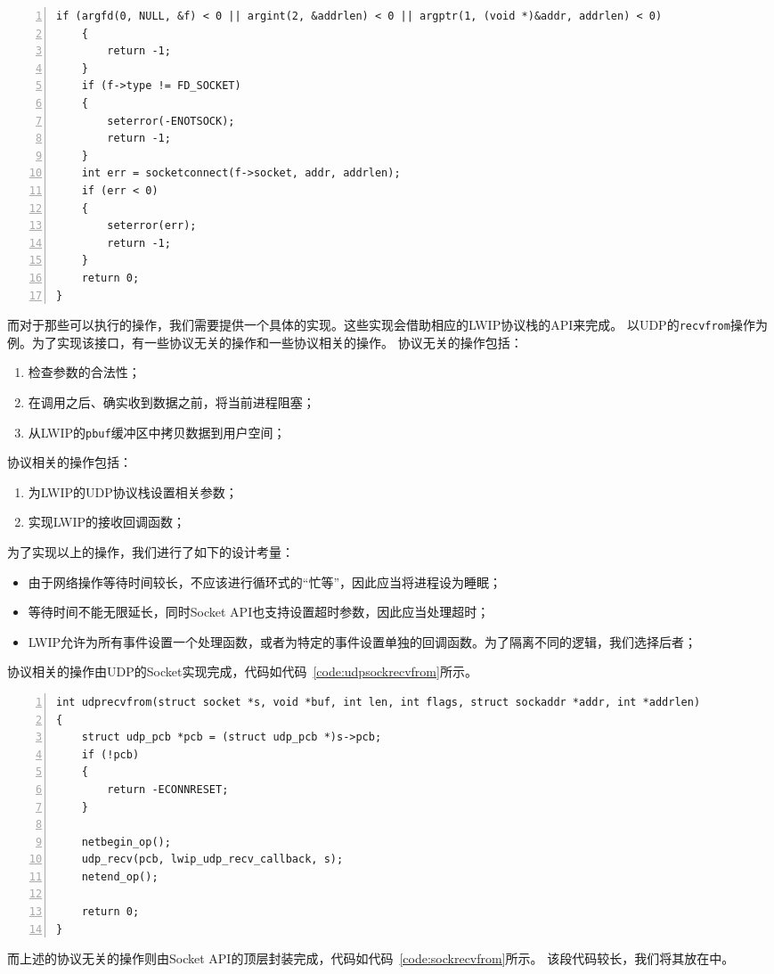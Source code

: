 \documentclass[a4paper,twoside]{ctexrep}
\begin{document}
\begin{spacing}{1.2}
\begin{lstlisting}[numbers=left,style=CppStyle,caption=\texttt{connect}系统调用实现,label={code:sysconnect}]
	if (argfd(0, NULL, &f) < 0 || argint(2, &addrlen) < 0 || argptr(1, (void *)&addr, addrlen) < 0)
	{
		return -1;
	}
	if (f->type != FD_SOCKET)
	{
		seterror(-ENOTSOCK);
		return -1;
	}
	int err = socketconnect(f->socket, addr, addrlen);
	if (err < 0)
	{
		seterror(err);
		return -1;
	}
	return 0;
}
\end{lstlisting}

而对于那些可以执行的操作，我们需要提供一个具体的实现。这些实现会借助相应的LWIP协议栈的API来完成。
以UDP的\texttt{recvfrom}操作为例。为了实现该接口，有一些协议无关的操作和一些协议相关的操作。
协议无关的操作包括：
\begin{enumerate}
	\item 检查参数的合法性；
	\item 在调用之后、确实收到数据之前，将当前进程阻塞；
	\item 从LWIP的\texttt{pbuf}缓冲区中拷贝数据到用户空间；
\end{enumerate}
协议相关的操作包括：
\begin{enumerate}
	\item 为LWIP的UDP协议栈设置相关参数；
	\item 实现LWIP的接收回调函数；
\end{enumerate}
为了实现以上的操作，我们进行了如下的设计考量：
\begin{itemize}
	\item 由于网络操作等待时间较长，不应该进行循环式的“忙等”，因此应当将进程设为睡眠；
	\item 等待时间不能无限延长，同时Socket API也支持设置超时参数，因此应当处理超时；
	\item LWIP允许为所有事件设置一个处理函数，或者为特定的事件设置单独的回调函数。为了隔离不同的逻辑，我们选择后者；
\end{itemize}

协议相关的操作由UDP的Socket实现完成，代码如代码~\ref{code:udpsockrecvfrom}所示。
\begin{lstlisting}[numbers=left,style=CppStyle,caption=UDP Socket实现,label={code:udpsockrecvfrom}]
int udprecvfrom(struct socket *s, void *buf, int len, int flags, struct sockaddr *addr, int *addrlen)
{
	struct udp_pcb *pcb = (struct udp_pcb *)s->pcb;
	if (!pcb)
	{
		return -ECONNRESET;
	}

	netbegin_op();
	udp_recv(pcb, lwip_udp_recv_callback, s);
	netend_op();

	return 0;
}
\end{lstlisting}

而上述的协议无关的操作则由Socket API的顶层封装完成，代码如代码~\ref{code:sockrecvfrom}所示。
该段代码较长，我们将其放在中。


\end{spacing}
\end{document}
